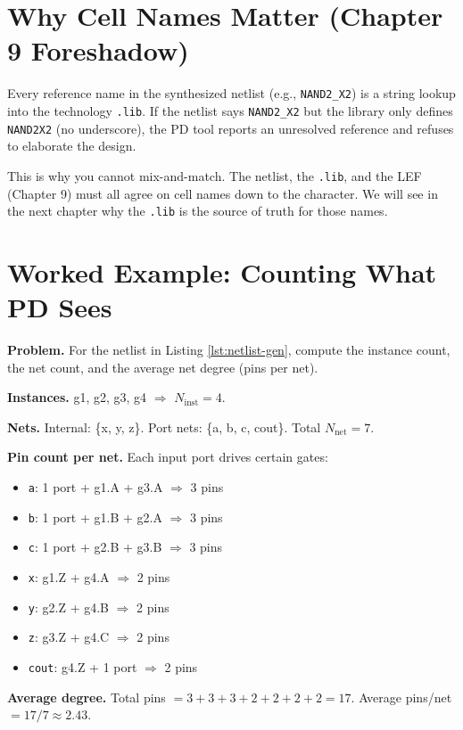 \section{Why Cell Names Matter (Chapter 9 Foreshadow)}

Every reference name in the synthesized netlist (e.g., \texttt{NAND2\_X2}) is a string lookup into the technology \texttt{.lib}. If the netlist says \texttt{NAND2\_X2} but the library only defines \texttt{NAND2X2} (no underscore), the PD tool reports an unresolved reference and refuses to elaborate the design.

This is why you cannot mix-and-match. The netlist, the \texttt{.lib}, and the LEF (Chapter 9) must all agree on cell names down to the character. We will see in the next chapter why the \texttt{.lib} is the source of truth for those names.

\section{Worked Example: Counting What PD Sees}

\textbf{Problem.} For the netlist in Listing \ref{lst:netlist-gen}, compute the instance count, the net count, and the average net degree (pins per net).

 \textbf{Instances.} g1, g2, g3, g4 \(\Rightarrow\) \(N_{\text{inst}} = 4\).

 \textbf{Nets.} Internal: \{x, y, z\}. Port nets: \{a, b, c, cout\}. Total \(N_{\text{net}} = 7\).

 \textbf{Pin count per net.} Each input port drives certain gates:
\begin{itemize}
  \item \texttt{a}: 1 port + g1.A + g3.A \(\Rightarrow\) 3 pins
  \item \texttt{b}: 1 port + g1.B + g2.A \(\Rightarrow\) 3 pins
  \item \texttt{c}: 1 port + g2.B + g3.B \(\Rightarrow\) 3 pins
  \item \texttt{x}: g1.Z + g4.A \(\Rightarrow\) 2 pins
  \item \texttt{y}: g2.Z + g4.B \(\Rightarrow\) 2 pins
  \item \texttt{z}: g3.Z + g4.C \(\Rightarrow\) 2 pins
  \item \texttt{cout}: g4.Z + 1 port \(\Rightarrow\) 2 pins
\end{itemize}

 \textbf{Average degree.} Total pins \(= 3+3+3+2+2+2+2 = 17\). Average pins/net \(= 17/7 \approx 2.43\).

